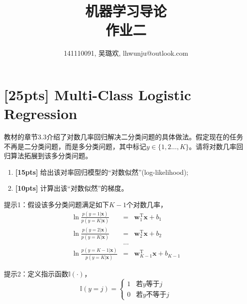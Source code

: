 \documentclass[a4paper,UTF8]{article}
\numberwithin{equation}{section}
\begin{document}
\title{机器学习导论\\
作业二}
\author{141110091, 吴璐欢, lhwunju@outlook.com}
\maketitle

\section{[25pts] Multi-Class Logistic Regression}
教材的章节3.3介绍了对数几率回归解决二分类问题的具体做法。假定现在的任务不再是二分类问题，而是多分类问题，其中标记$y\in\{1,2\dots,K\}$。请将对数几率回归算法拓展到该多分类问题。

\begin{enumerate}[(1)]
	\item \textbf{[15pts]} 给出该对率回归模型的“对数似然”(log-likelihood);
	\item \textbf{[10pts]} 计算出该“对数似然”的梯度。
\end{enumerate}

提示1：假设该多分类问题满足如下$K-1$个对数几率，
\begin{eqnarray*}
	\ln\frac{p(y=1|\mathbf{x})}{p(y=K|\mathbf{x})}&=&\mathbf{w}_1^\mathrm{T}\mathbf{x}+b_1\\
	\ln\frac{p(y=2|\mathbf{x})}{p(y=K|\mathbf{x})}&=&\mathbf{w}_2^\mathrm{T}\mathbf{x}+b_2\\
	&\dots&\\
	\ln\frac{p(y={K-1}|\mathbf{x})}{p(y=K|\mathbf{x})}&=&\mathbf{w}_{K-1}^\mathrm{T}\mathbf{x}+b_{K-1}
\end{eqnarray*}

提示2：定义指示函数$\mathbb{I}(\cdot)$，
$$\mathbb{I}(y=j)=
\begin{cases}
1& \text{若$y$等于$j$}\\
0& \text{若$y$不等于$j$}
\end{cases}$$
\end{document}
